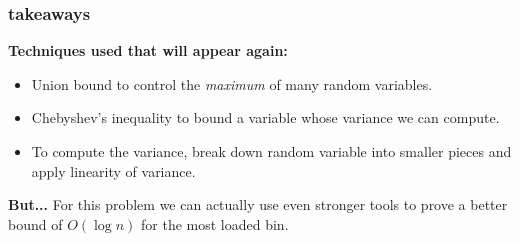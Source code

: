 \documentclass[handout,compress]{beamer}
\begin{document}
\begin{frame}
	\frametitle{takeaways}
	\textbf{Techniques used that will appear again:}
	\begin{itemize}
		\item Union bound to control the \emph{maximum} of many random variables. 
		\item Chebyshev's inequality to bound a variable whose variance we can compute.
		\item To compute the variance, break down random variable into smaller pieces and apply linearity of variance. 
	\end{itemize}
	
	\textbf{But...}
	For this problem we can actually use even stronger tools to prove a better bound of \emph{$O(\log n)$} for the most loaded bin.
	
\end{frame}
\end{document}
